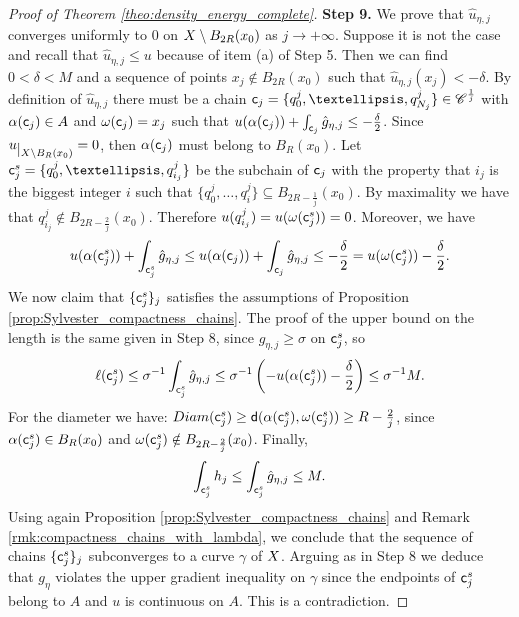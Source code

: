 \documentclass[12pt]{amsart}
\newcommand{\sfd}{{\sf d}}
\newcommand{\restr}[1]{\lower3pt\hbox{$|_{#1}$}}
\newcommand{\X}{{\rm X}}
\theoremstyle{definition}
\newcommand{\sfc}{{\sf c}}
\newcommand{\Chain}[1]{\mathscr{C}^{#1}}
\begin{document}
\begin{proof}[Proof of Theorem \ref{theo:density_energy_complete}]
    {\bf Step 9.} We prove that $\hat{u}_{\eta,j}$ converges uniformly to $0$ on $\X\setminus B_{2R}(x_0)$ as $j\to +\infty$. Suppose it is not the case and recall that $\hat{u}_{\eta,j} \le u$ because of item (a) of Step 5. Then we can find $0<\delta <M$ and a sequence of points $x_j\notin B_{2R}(x_0)$ such that $\hat{u}_{\eta,j}(x_j) < -\delta$. By definition of $\hat{u}_{\eta,j}$ there must be a chain $\sfc_j = \{q_0^j,\ldots,q_{N_j}^j\} \in \Chain{\frac{1}{j}}$ with $\alpha(\sfc_j) \in A$ and $\omega(\sfc_j) = x_j$ such that $u(\alpha(\sfc_j)) + \int_{\sfc_j}\hat{g}_{\eta,j} \le -\frac{\delta}{2}$. Since $u\restr{\X \setminus B_{R}(x_0)} = 0$, then $\alpha(\sfc_j)$ must belong to $B_R(x_0)$. Let $\sfc_j^s = \{q_0^j,\ldots,q_{i_j}^j\}$ be the subchain of $\sfc_j$ with the property that $i_j$ is the biggest integer $i$ such that $\{q_0^j,\ldots,q_{i}^j\} \subseteq B_{2R - \frac{1}{j}}(x_0)$. By maximality we have that $q_{i_j}^j \notin B_{2R - \frac{2}{j}}(x_0)$. Therefore $u(q_{i_j}^j) = u(\omega(\sfc_j^s)) = 0$. Moreover, we have
    \begin{equation}
        \label{eq:UG_inequality_violated_uniform_convergence}
        u(\alpha(\sfc_j^s)) + \int_{\sfc_j^s}\hat{g}_{\eta,j} \le u(\alpha(\sfc_j)) + \int_{\sfc_j}\hat{g}_{\eta,j} \le -\frac{\delta}{2} = u(\omega(\sfc_j^s)) - \frac{\delta}{2}.
    \end{equation}
    We now claim that $\{\sfc_j^s\}_j$ satisfies the assumptions of Proposition \ref{prop:Sylvester_compactness_chains}. The proof of the upper bound on the length is the same given in Step 8, since $\hat{g}_{\eta,j} \ge \sigma$ on $\sfc_j^s$, so
    $$\ell(\sfc_j^s) \le \sigma^{-1}\int_{\sfc_j^s} \hat{g}_{\eta,j} \le \sigma^{-1}\left(-u(\alpha(\sfc_j^s)) - \frac{\delta}{2}\right) \le \sigma^{-1}M.$$
    For the diameter we have: ${\rm Diam}(\sfc_j^s) \ge \sfd(\alpha(\sfc_j^s), \omega(\sfc_j^s)) \ge R - \frac{2}{j}$, since $\alpha(\sfc_j^s) \in B_R(x_0)$ and $\omega(\sfc_j^s) \notin B_{2R - \frac{2}{j}}(x_0)$. Finally, 
    $$\int_{\sfc_j^s} h_j \le \int_{\sfc_j^s} \hat{g}_{\eta,j} \le M.$$
    Using again Proposition \ref{prop:Sylvester_compactness_chains} and Remark \ref{rmk:compactness_chains_with_lambda}, we conclude that the sequence of chains $\{\sfc_j^s\}_j$ subconverges to a curve $\gamma$ of $\X$. Arguing as in Step 8 we deduce that $g_\eta$ violates the upper gradient inequality on $\gamma$ since the endpoints of $\sfc_j^s$ belong to $A$ and $u$ is continuous on $A$. This is a contradiction.
\end{proof}
\end{document}
